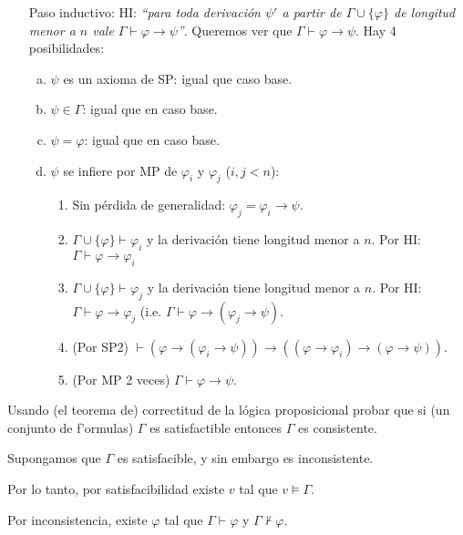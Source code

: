 \begin{questions}
\begin{solution}
\begin{itemize}[\quad]
  \item[Paso inductivo:] HI: {\it ``para toda derivaci\'on $\psi'$ a partir de $\Gamma\cup\{\varphi\}$ de longitud menor a $n$ vale $\Gamma\vdash\varphi\rightarrow\psi$''}. Queremos ver que $\Gamma\vdash\varphi\rightarrow\psi$. Hay 4 posibilidades: 
  \begin{enumerate}[a)]
   \item $\psi$ es un axioma de SP: igual que caso base. 
   \item $\psi\in\Gamma$: igual que en caso base. 
   \item $\psi=\varphi$: igual que en caso base. 
   \item $\psi$ se infiere por MP de $\varphi_i$ y $\varphi_j$ ($i,j<n$): 
   \begin{enumerate}[1.]
    \item Sin p\'erdida de generalidad: $\varphi_j=\varphi_i\rightarrow\psi$. 
    \item $\Gamma\cup\{\varphi\}\vdash\varphi_i$ y la derivaci\'on tiene longitud menor a $n$. Por HI: $\Gamma\vdash\varphi\rightarrow\varphi_i$
    \item $\Gamma\cup\{\varphi\}\vdash\varphi_j$ y la derivaci\'on tiene longitud menor a $n$. Por HI: $\Gamma\vdash\varphi\rightarrow\varphi_j$ (i.e. $\Gamma\vdash\varphi\rightarrow(\varphi_j\rightarrow\psi)$.
    \item (Por SP2) $\vdash (\varphi\rightarrow(\varphi_i\rightarrow\psi))\rightarrow((\varphi\rightarrow\varphi_i)\rightarrow(\varphi\rightarrow\psi))$.
    \item (Por MP 2 veces) $\Gamma\vdash\varphi\rightarrow\psi$.
   \end{enumerate}
  \end{enumerate}

 \end{itemize}

\end{solution}

\question Usando (el teorema de) correctitud de la lógica proposicional probar que si (un conjunto de f'ormulas) $\Gamma$ es satisfactible entonces $\Gamma$ es consistente. 
\begin{solution}

Supongamos que $\Gamma$ es satisfacible, y sin embargo es inconsistente. 

Por lo tanto, por satisfacibilidad existe $v$ tal que $v\vDash\Gamma$.

Por inconsistencia, existe $\varphi$ tal que $\Gamma \vdash \varphi$ y $\Gamma \nvdash \varphi$.


\end{solution}
\end{questions}
